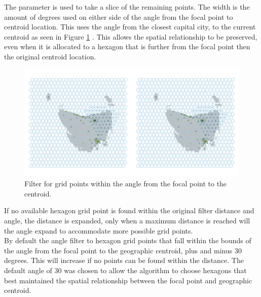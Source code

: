 \documentclass[
]{jss}
\begin{document}
The  parameter is used to take a slice of the remaining
points. The width is the amount of degrees used on either side of the
angle from the focal point to centroid location. This uses the angle
from the closest capital city, to the current centroid as seen in Figure
\ref{fig:angles} . This allows the spatial relationship to be preserved,
even when it is allocated to a hexagon that is further from the focal
point then the original centroid location.

\begin{CodeChunk}
\begin{figure}

{\centering \includegraphics[width=1\linewidth]{figures/5allocate} 

}

\caption[Filter for grid points within the angle from the focal point to the centroid]{Filter for grid points within the angle from the focal point to the centroid.}\label{fig:angles}
\end{figure}
\end{CodeChunk}

If no available hexagon grid point is found within the original filter
distance and angle, the distance is expanded, only when a maximum
distance is reached will the angle expand to accommodate more possible
grid points.\\
By default the angle filter to hexagon grid points that fall within the
bounds of the angle from the focal point to the geographic centroid,
plus and minus 30 degrees. This will increase if no points can be found
within the  distance. The default angle of 30 was
chosen to allow the algorithm to choose hexagons that best maintained
the spatial relationship between the focal point and geographic
centroid.
\end{document}
